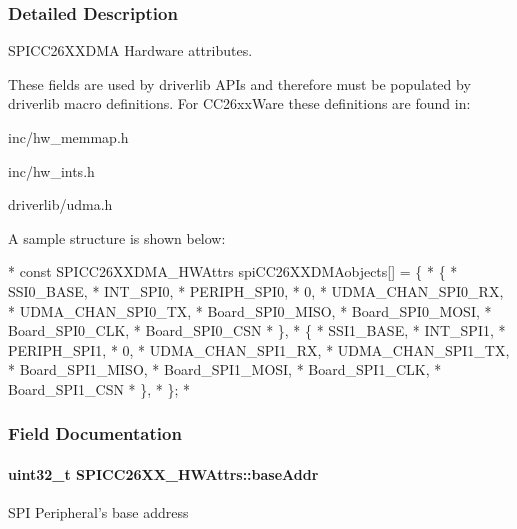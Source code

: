 \subsubsection{Detailed Description}
S\-P\-I\-C\-C26\-X\-X\-D\-M\-A Hardware attributes. 

These fields are used by driverlib A\-P\-Is and therefore must be populated by driverlib macro definitions. For C\-C26xx\-Ware these definitions are found in\-:
\begin{DoxyItemize}
\item inc/hw\-\_\-memmap.\-h
\item inc/hw\-\_\-ints.\-h
\item driverlib/udma.\-h
\end{DoxyItemize}

A sample structure is shown below\-: 
\begin{DoxyCode}
*  \textcolor{keyword}{const} SPICC26XXDMA\_HWAttrs spiCC26XXDMAobjects[] = \{
*      \{
*          SSI0\_BASE,
*          INT\_SPI0,
*          PERIPH\_SPI0,
*          0,
*          UDMA\_CHAN\_SPI0\_RX,
*          UDMA\_CHAN\_SPI0\_TX,
*          Board\_SPI0\_MISO,
*          Board\_SPI0\_MOSI,
*          Board\_SPI0\_CLK,
*          Board\_SPI0\_CSN
*      \},
*      \{
*          SSI1\_BASE,
*          INT\_SPI1,
*          PERIPH\_SPI1,
*          0,
*          UDMA\_CHAN\_SPI1\_RX,
*          UDMA\_CHAN\_SPI1\_TX,
*          Board\_SPI1\_MISO,
*          Board\_SPI1\_MOSI,
*          Board\_SPI1\_CLK,
*          Board\_SPI1\_CSN
*      \},
*  \};
*  
\end{DoxyCode}
 

\subsubsection{Field Documentation}
\paragraph[{base\-Addr}]{\setlength{\rightskip}{0pt plus 5cm}uint32\-\_\-t S\-P\-I\-C\-C26\-X\-X\-\_\-\-H\-W\-Attrs\-::base\-Addr}\label{struct_s_p_i_c_c26_x_x___h_w_attrs_a7e7cb3e32890a0b812a4c0bf989506a1}
S\-P\-I Peripheral's base address 

